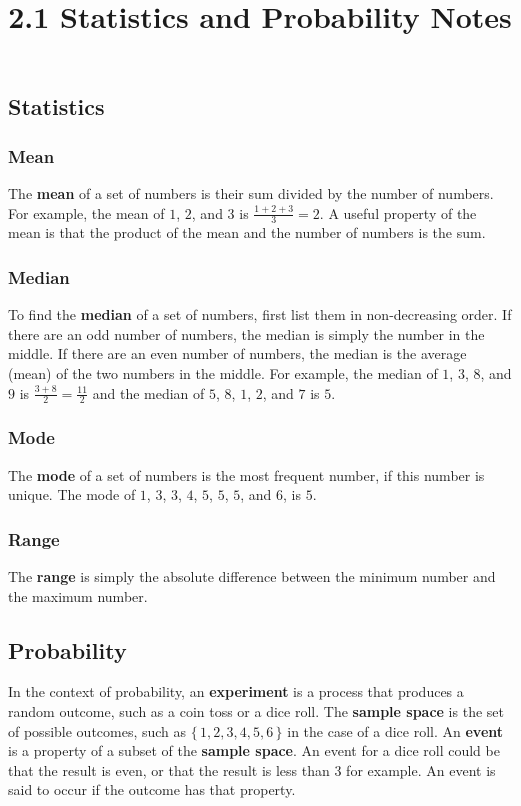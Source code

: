 \documentclass[twocolumn]{article}
\title{2.1 Statistics and Probability Notes}
\author{}
\date{}
\begin{document}
\maketitle

\subsection*{Statistics}
\subsubsection*{Mean}
The \textbf{mean} of a set of numbers is their sum divided by the number of numbers.
For example, the mean of $1$, $2$, and $3$ is $\frac{1 + 2 + 3}{3} = 2$.
A useful property of the mean is that the product of the mean and the number of numbers is the sum.

\subsubsection*{Median}
To find the \textbf{median} of a set of numbers, first list them in non-decreasing order.
If there are an odd number of numbers, the median is simply the number in the middle.
If there are an even number of numbers, the median is the average (mean) of the two numbers in the middle.
For example, the median of $1$, $3$, $8$, and $9$ is $\frac{3 + 8}{2} = \frac{11}{2}$ and the median of $5$, $8$, $1$, $2$, and $7$ is $5$.

\subsubsection*{Mode}
The \textbf{mode} of a set of numbers is the most frequent number, if this number is unique.
The mode of $1$, $3$, $3$, $4$, $5$, $5$, $5$, and $6$, is $5$.

\subsubsection*{Range}
The \textbf{range} is simply the absolute difference between the minimum number and the maximum number.

\subsection*{Probability}
In the context of probability, an \textbf{experiment} is a process that produces a random outcome, such as a coin toss or a dice roll.
The \textbf{sample space} is the set of possible outcomes, such as $\{\, 1, 2, 3, 4, 5, 6 \,\}$ in the case of a dice roll.
An \textbf{event} is a property of a subset of the \textbf{sample space}.
An event for a dice roll could be that the result is even, or that the result is less than $3$ for example.
An event is said to occur if the outcome has that property.
\end{document}
